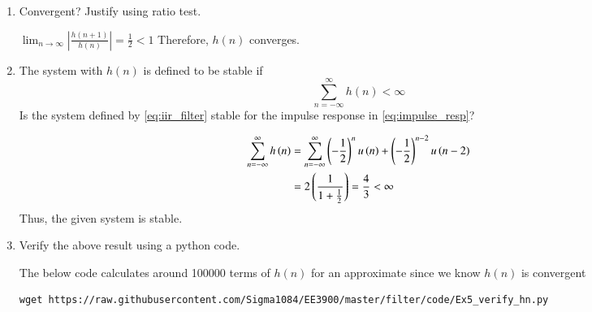 \documentclass[journal,12pt,twocolumn]{IEEEtran}
\renewcommand\thesection{\arabic{section}}
\begin{document}
\begin{enumerate}[label=\thesection.\arabic*]
\item Convergent? Justify using ratio test. \\
\solution

$\lim_{n \to \infty}\left|\frac{h(n + 1)}{h(n)}\right| = \frac{1}{2} < 1$ Therefore, $h(n)$ converges.

%
\item The system with $h(n)$ is defined to be stable if
\begin{equation}
\sum_{n=-\infty}^{\infty}h(n) < \infty
\end{equation}
Is the system defined by \eqref{eq:iir_filter} stable for the impulse response in \eqref{eq:impulse_resp}?

\solution
\begin{align*}
	\sum_{n = -\infty}^{\infty}h\left(n\right) &= \sum_{n = -\infty}^{\infty}
	\left(-\frac{1}{2}\right)^nu\left(n\right) + \left(-\frac{1}{2}\right)^{n - 2}u\left(n - 2\right) \\
	&= 2\left(\frac{1}{1 + \frac{1}{2}}\right) = \frac{4}{3} < \infty
\end{align*}
Thus, the given system is stable.

%

\item Verify the above result using a python code.

\solution
The below code calculates around 100000 terms of $h(n)$ for an approximate since we know $h(n)$ is convergent

\begin{lstlisting}
wget https://raw.githubusercontent.com/Sigma1084/EE3900/master/filter/code/Ex5_verify_hn.py
\end{lstlisting}


\end{enumerate}
\end{document}
